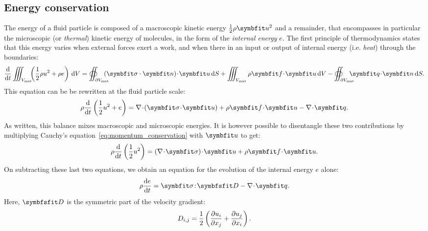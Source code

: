 \subsection{Energy conservation}
The energy of a fluid particle is composed of a macroscopic kinetic energy $\tfrac{1}{2}\rho \bu^2$ and a remainder, that encompasses in particular the microscopic (or \textit{thermal}) kinetic energy of molecules, in the form of the \textit{internal energy} $e$. The first principle of thermodynamics states that this energy varies when external forces exert a work, and when there in an input or output of internal energy (i.e. \textit{heat}) through the boundaries:
\begin{equation}
\dd{}{t} \iiint_{V_\text{mat}} \!\!\!\lp \frac{1}{2}\rho u^2 + \rho e\rp \,\dV = \oiint_{\partial V_\text{mat}} \!\!\!\!\!\!\lp\symbfit\sigma \cdot \bn\rp\!\cdot\!\bu \,\dS + \iiint _{V_\text{mat}}\rho \bff \!\cdot\! \bu \,\dV - \oiint_{\partial V_\text{mat}}\!\!\!\!\!\!\bq\!\cdot\!\bn\,\dS.
\end{equation}
This equation can be be rewritten at the fluid particle scale:
\begin{equation}
\rho\dd{}{t} \lp \frac{1}{2}u^2 + e\rp = \nabla\!\cdot\!\lp\symbfit\sigma\! \cdot\! \bu\rp + \rho \bff \!\cdot\! \bu  - \nabla\!\cdot\!\bq.
\end{equation}
As written, this balance mixes macroscopic and microscopic energies. It is however possible to disentangle these two contributions by multiplying Cauchy's equation~\eqref{eq:momentum_conservation} with $\bu$ to get:
\begin{equation}
\rho\dd{}{t} \lp \frac{1}{2} u^2 \rp = \lp\nabla\!\cdot\!\symbfit\sigma\rp\! \cdot\! \bu + \rho \bff \!\cdot\! \bu.
\end{equation}
On subtracting these last two equations, we obtain an equation for the evolution of the internal energy $e$ alone:
\begin{equation}
\rho\dd{e}{t}  = \symbfit\sigma \!:\! \symbfsfit D  - \nabla\!\cdot\!\bq.
\label{eq:internal_energy}
\end{equation}
Here, $\symbfsfit D$ is the symmetric part of the velocity gradient:
\begin{equation}
D_{i,j} = \frac{1}{2}\left(\frac{\partial \vphantom{u_j}u_i}{\partial x_j}+\frac{\partial u_j}{\partial x_i}\right) .
\end{equation}

